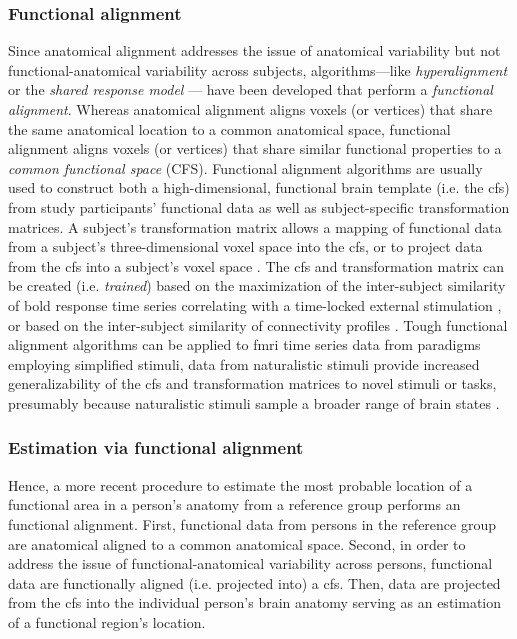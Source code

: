 \subsubsection{Functional alignment}
%
Since anatomical alignment addresses the issue of anatomical variability but not
functional-anatomical variability across subjects, algorithms---like
\textit{hyperalignment} \citep{haxby2011common, guntupalli2016model} or the
\textit{shared response model} \citep{chen2015reduced, zhang2016searchlight}---
have been developed that perform a \textit{functional alignment}.
%
Whereas anatomical alignment aligns voxels (or vertices) that share the same
anatomical location to a common anatomical space, functional alignment aligns
voxels (or vertices) that share similar functional properties to
a \textit{common functional space} (CFS).
%
Functional alignment algorithms are usually used to construct both a
high-dimensional, functional brain template (i.e. the \ac{cfs}) from study
participants' functional data as well as subject-specific transformation
matrices.
%
A subject's transformation matrix allows a mapping of functional data from a
subject's three-dimensional voxel space into the \ac{cfs}, or to project data
from the \ac{cfs} into a subject's voxel space \citep{haxby2020hyperalignment,
kumar2020brainiak}.
%
The \ac{cfs} and transformation matrix can be created (i.e.  \textit{trained})
based on the maximization of the inter-subject similarity of \ac{bold} response
time series correlating with a time-locked external stimulation
\citep{haxby2011common, chen2015reduced, sabuncu2010function}, or based on the
inter-subject similarity of connectivity profiles \citep{feilong2018reliable,
guntupalli2018computational, nastase2019leveraging}.
%
Tough functional alignment algorithms can be applied to \ac{fmri} time series
data from paradigms employing simplified stimuli, data from naturalistic stimuli
provide increased generalizability of the \ac{cfs} and transformation matrices
to novel stimuli or tasks, presumably because naturalistic stimuli sample a
broader range of brain states \citep{haxby2011common, guntupalli2016model}.




\subsubsection{Estimation via functional alignment}
%
Hence, a more recent procedure \citep[e.g., ][]{jiahui2020predicting,
guntupalli2016model, haxby2011common} to estimate the most probable location of
a functional area in a person's anatomy from a reference group performs an
functional alignment.
First, functional data from persons in the reference group are anatomical
aligned to a common anatomical space.
%
Second, in order to address the issue of functional-anatomical variability
across persons, functional data are functionally aligned (i.e. projected into) a
\ac{cfs}.
%
Then, data are projected from the \ac{cfs} into the individual person's brain
anatomy serving as an estimation of a functional region's location.

